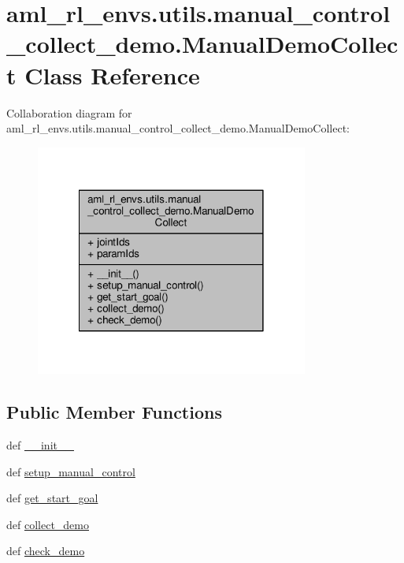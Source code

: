 \hypertarget{classaml__rl__envs_1_1utils_1_1manual__control__collect__demo_1_1_manual_demo_collect}{\section{aml\-\_\-rl\-\_\-envs.\-utils.\-manual\-\_\-control\-\_\-collect\-\_\-demo.\-Manual\-Demo\-Collect Class Reference}
\label{classaml__rl__envs_1_1utils_1_1manual__control__collect__demo_1_1_manual_demo_collect}
}


Collaboration diagram for aml\-\_\-rl\-\_\-envs.\-utils.\-manual\-\_\-control\-\_\-collect\-\_\-demo.\-Manual\-Demo\-Collect\-:
\nopagebreak
\begin{figure}[H]
\begin{center}
\leavevmode
\includegraphics[width=254pt]{classaml__rl__envs_1_1utils_1_1manual__control__collect__demo_1_1_manual_demo_collect__coll__graph}
\end{center}
\end{figure}
\subsection*{Public Member Functions}
\begin{DoxyCompactItemize}
\item 
def \hyperlink{classaml__rl__envs_1_1utils_1_1manual__control__collect__demo_1_1_manual_demo_collect_ac811dc849f7e94e5cca8f88773cb9ee1}{\-\_\-\-\_\-init\-\_\-\-\_\-}
\item 
def \hyperlink{classaml__rl__envs_1_1utils_1_1manual__control__collect__demo_1_1_manual_demo_collect_a7a9ab3d4f5dbfdb89eff2fdc6379c77c}{setup\-\_\-manual\-\_\-control}
\item 
def \hyperlink{classaml__rl__envs_1_1utils_1_1manual__control__collect__demo_1_1_manual_demo_collect_a32eac6047ba77fb287a1801ebe47fbe5}{get\-\_\-start\-\_\-goal}
\item 
def \hyperlink{classaml__rl__envs_1_1utils_1_1manual__control__collect__demo_1_1_manual_demo_collect_a6c84d8e71c3675582aa4c6e7a9354333}{collect\-\_\-demo}
\item 
def \hyperlink{classaml__rl__envs_1_1utils_1_1manual__control__collect__demo_1_1_manual_demo_collect_a419477fcd587826e040b25afea67a2ac}{check\-\_\-demo}
\end{DoxyCompactItemize}
